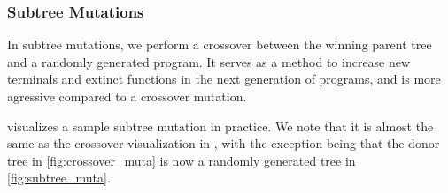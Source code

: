 \subsubsection{Subtree Mutations}
\label{subsec:subtree}
In subtree mutations, we perform a crossover between the winning parent tree and a randomly generated program. It serves as a method to increase new terminals and extinct functions in the next generation of programs, and is more agressive compared to a crossover mutation.\citep{gplearn} 

 visualizes a sample subtree mutation in practice. We note that it is almost the same as the crossover visualization in , with  the exception being that the donor tree in \cref*{fig:crossover_muta} is now a randomly generated tree in \cref*{fig:subtree_muta}. 


